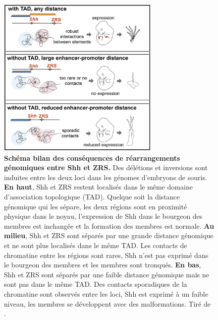 \begin{figure}[h]
    \centering
    \includegraphics[width=0.7\textwidth, page=1] {figures/introduction/fig35.png}
    \caption[Schéma bilan des conséquences de réarrangements génomiques entre Shh et ZRS.]{
    \textbf{Schéma bilan des conséquences de réarrangements génomiques entre Shh et ZRS.}
    Des délétions et inversions sont induites entre les deux loci dans les génomes d'embryons de souris. \textbf{En haut}, Shh et ZRS restent localisés dans le même domaine d'association topologique (TAD). Quelque soit la distance génomique qui les sépare, les deux régions sont en proximité physique dans le noyau, l'expression de Shh dans le bourgeon des membres est inchangée et la formation des membres est normale. \textbf{Au milieu}, Shh et ZRS sont séparés par une grande distance génomique et ne sont plus localisés dans le même TAD. Les contacts de chromatine entre les régions sont rares, Shh n'est pas exprimé dans le bourgeon des membres et les membres sont tronqués. \textbf{En bas}, Shh et ZRS sont séparés par une faible distance génomique mais ne sont pas dans le même TAD. Des contacts sporadiques de la chromatine sont observés entre les loci, Shh est exprimé à un faible niveau, les membres se développent avec des malformations. 
    Tiré de \citep{symmons_SHH_2016}. \\
    }
    \label{fig:Fig35}
\end{figure}

